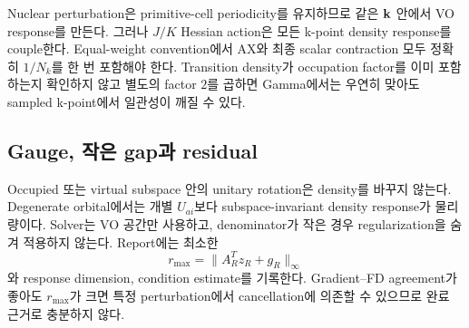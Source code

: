 Nuclear perturbation은 primitive-cell periodicity를 유지하므로 같은 $\mathbf{k}$ 안에서 VO
response를 만든다. 그러나 $J/K$ Hessian action은 모든 k-point density response를
couple한다. Equal-weight convention에서 AX와 최종 scalar contraction 모두 정확히
$1/N_k$를 한 번 포함해야 한다. Transition density가 occupation factor를 이미 포함하는지
확인하지 않고 별도의 factor $2$를 곱하면 Gamma에서는 우연히 맞아도 sampled k-point에서
일관성이 깨질 수 있다.

\subsection{Gauge, 작은 gap과 residual}

Occupied 또는 virtual subspace 안의 unitary rotation은 density를 바꾸지 않는다.
Degenerate orbital에서는 개별 $U_{ai}$보다 subspace-invariant density response가
물리량이다. Solver는 VO 공간만 사용하고, denominator가 작은 경우 regularization을
숨겨 적용하지 않는다. Report에는 최소한
\begin{equation}
  r_{\max}=\|A_R^Tz_R+g_R\|_\infty
  \label{eq:zvector-residual}
\end{equation}
와 response dimension, condition estimate를 기록한다. Gradient--FD agreement가 좋아도
$r_{\max}$가 크면 특정 perturbation에서 cancellation에 의존할 수 있으므로 완료 근거로
충분하지 않다.
